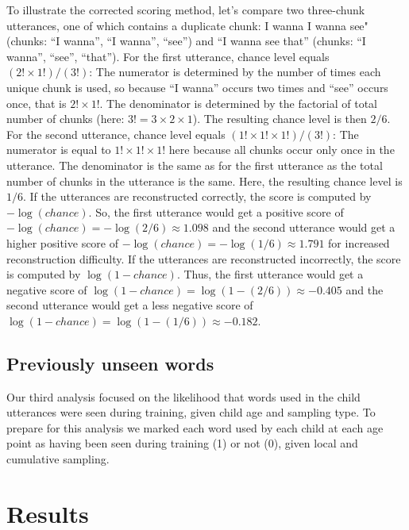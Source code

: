\documentclass[
  english,
  man,floatsintext]{apa6}
\begin{document}
To illustrate the corrected scoring method, let's compare two three-chunk utterances, one of which contains a duplicate chunk: I wanna I wanna see" (chunks: \enquote{I wanna}, \enquote{I wanna}, \enquote{see}) and \enquote{I wanna see that} (chunks: \enquote{I wanna}, \enquote{see}, \enquote{that}). For the first utterance, chance level equals \((2!\times1!)/(3!)\): The numerator is determined by the number of times each unique chunk is used, so because \enquote{I wanna} occurs two times and \enquote{see} occurs once, that is \(2!\times1!\). The denominator is determined by the factorial of total number of chunks (here: \(3! = 3\times2\times1\)). The resulting chance level is then \(2/6\). For the second utterance, chance level equals \((1!\times1!\times1!)/(3!)\): The numerator is equal to \(1!\times1!\times1!\) here because all chunks occur only once in the utterance. The denominator is the same as for the first utterance as the total number of chunks in the utterance is the same. Here, the resulting chance level is \(1/6\). If the utterances are reconstructed correctly, the score is computed by \(-\log(chance)\). So, the first utterance would get a positive score of \(-\log(chance) = -\log(2/6) \approx 1.098\) and the second utterance would get a higher positive score of \(-\log(chance) = -\log(1/6) \approx 1.791\) for increased reconstruction difficulty. If the utterances are reconstructed incorrectly, the score is computed by \(\log(1-chance)\). Thus, the first utterance would get a negative score of \(\log(1-chance) = \log(1-(2/6)) \approx -0.405\) and the second utterance would get a less negative score of \(\log(1-chance) = \log(1-(1/6)) \approx -0.182\).

\hypertarget{previously-unseen-words}{%
\subsection{Previously unseen words}\label{previously-unseen-words}}

Our third analysis focused on the likelihood that words used in the child utterances were seen during training, given child age and sampling type. To prepare for this analysis we marked each word used by each child at each age point as having been seen during training (1) or not (0), given local and cumulative sampling.

\hypertarget{results}{%
\section{Results}\label{results}}
\end{document}
